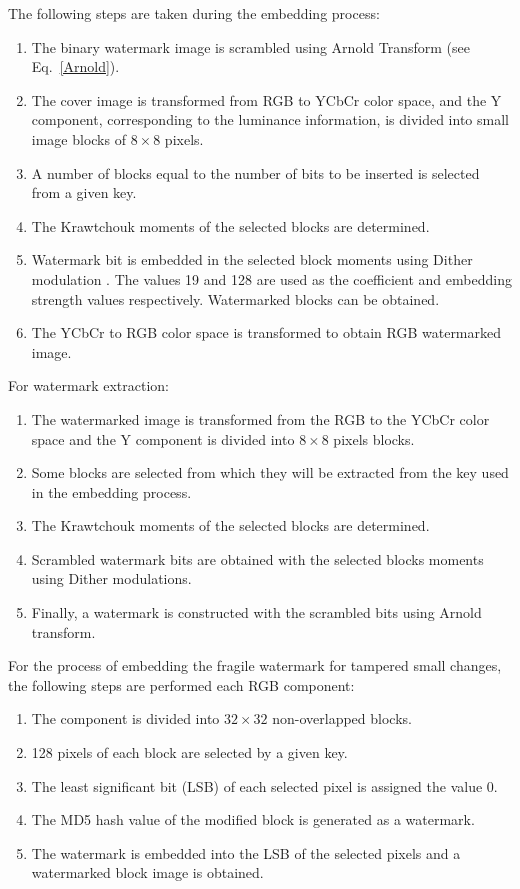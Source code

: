 \documentclass[runningheads]{llncs}
\begin{document}
The following steps are taken during the embedding process:
\begin{enumerate}
	\item The binary watermark image is scrambled using Arnold Transform (see Eq.~\ref{Arnold}).
	\item The cover image is transformed from RGB to YCbCr color space, and the Y component, corresponding to the luminance information, is divided into small image blocks of $8\times 8$ pixels.
	\item A number of blocks equal to the number of bits to be inserted is selected from a given key.
	\item The Krawtchouk moments \cite{Yap2003} of the selected blocks are determined.
	\item Watermark bit is embedded in the selected block moments using Dither modulation \cite{chen2001quantization}. The values 19 and 128 are used as the coefficient and embedding strength values respectively. Watermarked blocks can be obtained. 
	\item The YCbCr to RGB color space is transformed to obtain RGB watermarked image.
\end{enumerate}

For watermark extraction:
\begin{enumerate}
	\item The watermarked image is transformed from the RGB to the YCbCr color space and the Y component is divided into $8\times 8$ pixels blocks.
	\item Some blocks are selected from which they will be extracted from the key used in the embedding process.
	\item The Krawtchouk moments of the selected blocks are determined.
	\item Scrambled watermark bits are obtained with the selected blocks moments using Dither modulations.
	\item Finally, a watermark is constructed with the scrambled bits using Arnold transform.
\end{enumerate}

For the process of embedding the fragile watermark for tampered small changes, the following steps are performed each RGB component:
\begin{enumerate}
	\item The component is divided into $32\times 32$ non-overlapped blocks.
	\item 128 pixels of each block are selected by a given key.
	\item The least significant bit (LSB) of each selected pixel is assigned the value 0.
	\item The MD5 hash value of the modified block is generated as a watermark.
	\item The watermark is embedded into the LSB of the selected pixels and a watermarked block image is obtained.  
\end{enumerate}    
\end{document}
